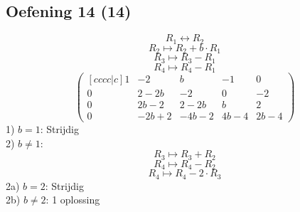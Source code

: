 \documentclass[lineaire_algebra_oplossingen.tex]{subfiles}
\begin{document}
\subsection{Oefening 14 (14)}
\[R_1 \leftrightarrow R_2 \]
\[R_2 \longmapsto R_2 + b\cdot R_1\]
\[R_3 \longmapsto R_3 - R_1\]
\[R_4 \longmapsto R_4 - R_1\]
\[
\begin{pmatrix}[cccc|c]
1 &  -2 &  b & -1 & 0\\
0 &  2-2b &  -2 & 0 & -2\\
0 & 2b-2 & 2-2b & b & 2\\
0 & -2b+2 & -4b-2 & 4b-4 & 2b-4
\end{pmatrix}
\]
1) $b=1$: Strijdig\\
2) $b \neq 1$:
\[R_3 \longmapsto R_3 + R_2\]
\[R_4 \longmapsto R_4 - R_2\]
\[R_4 \longmapsto R_4 -2 \cdot R_3\]
2a) $b=2$: Strijdig\\
2b) $b \neq 2$: 1 oplossing
\end{document}
